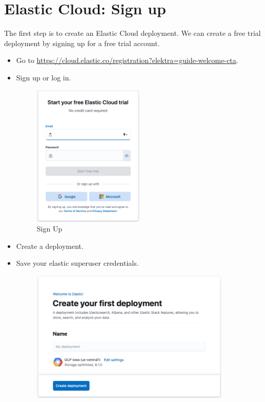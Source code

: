 \documentclass{report}
\begin{document}
\section{Elastic Cloud: Sign up}
The first step is to create an Elastic Cloud deployment. 
We can create a free trial deployment by signing up for a free trial account.
\begin{itemize}
	\item Go to \url{https://cloud.elastic.co/registration?elektra=guide-welcome-cta}.
	\item Sign up or log in.
	\begin{figure}[!h]
		\centering
		\includegraphics[width=0.5\textwidth]{Images/sign-up-trial.png}
		\caption{Sign Up}
		\label{fig:Sign Up}
	\end{figure}
	\item Create a deployment.
	\item Save your elastic superuser credentials.
	\begin{figure}[!h]
		\centering
		\begin{minipage}{.45\textwidth}	
			\centering	
			\includegraphics[width=0.9\textwidth]{Images/create-first-deployment.png}

\end{minipage}
\end{figure}
\end{itemize}
\end{document}

